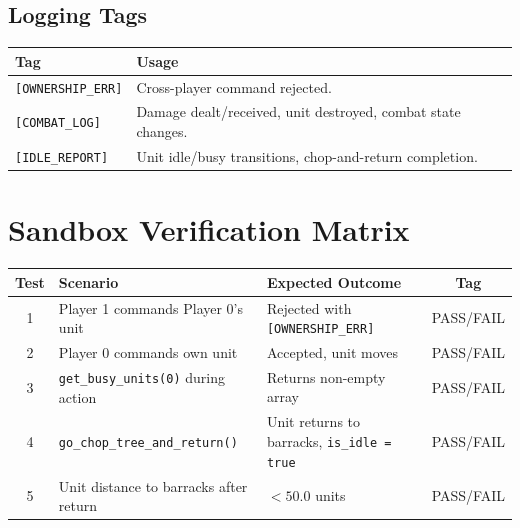 \documentclass[11pt,a4paper]{article}
\begin{document}
\subsection{Logging Tags}

\begin{center}
\begin{tabular}{|l|p{8cm}|}
\hline
\textbf{Tag} & \textbf{Usage} \\
\hline
\texttt{[OWNERSHIP\_ERR]} & Cross-player command rejected. \\
\texttt{[COMBAT\_LOG]}    & Damage dealt/received, unit destroyed, combat state changes. \\
\texttt{[IDLE\_REPORT]}   & Unit idle/busy transitions, chop-and-return completion. \\
\hline
\end{tabular}
\end{center}

\section{Sandbox Verification Matrix}

\begin{center}
\begin{tabular}{|c|p{5cm}|p{5cm}|c|}
\hline
\textbf{Test} & \textbf{Scenario} & \textbf{Expected Outcome} & \textbf{Tag} \\
\hline
1 & Player 1 commands Player 0's unit & Rejected with \texttt{[OWNERSHIP\_ERR]} & PASS/FAIL \\
2 & Player 0 commands own unit & Accepted, unit moves & PASS/FAIL \\
3 & \texttt{get\_busy\_units(0)} during action & Returns non-empty array & PASS/FAIL \\
4 & \texttt{go\_chop\_tree\_and\_return()} & Unit returns to barracks, \texttt{is\_idle = true} & PASS/FAIL \\
5 & Unit distance to barracks after return & $< 50.0$ units & PASS/FAIL \\
\hline
\end{tabular}
\end{center}
\end{document}
